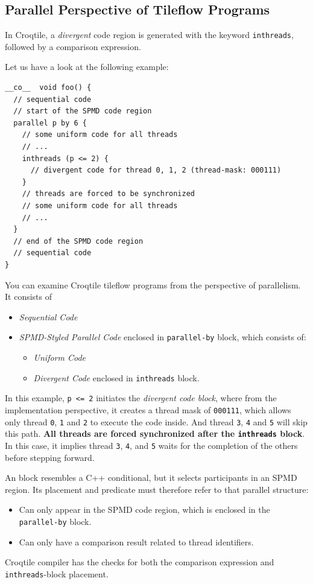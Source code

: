\subsection*{Parallel Perspective of Tileflow Programs}

In Croqtile, a \emph{divergent} code region is generated with the keyword \texttt{inthreads}, followed by a comparison expression.

Let us have a look at the following example:

\begin{lstlisting}[language=croqtile,caption={Parallel Perspective of Tileflow Programs}]
__co__  void foo() {
  // sequential code
  // start of the SPMD code region
  parallel p by 6 {
    // some uniform code for all threads
    // ...
    inthreads (p <= 2) {
      // divergent code for thread 0, 1, 2 (thread-mask: 000111)
    }
    // threads are forced to be synchronized
    // some uniform code for all threads
    // ...
  }
  // end of the SPMD code region
  // sequential code
}
\end{lstlisting}

You can examine Croqtile tileflow programs from the perspective of parallelism. It consists of

\begin{itemize}[leftmargin=1.6em]
\item \emph{Sequential Code}
\item \emph{SPMD-Styled Parallel Code} enclosed in \texttt{parallel-by} block, which consists of:
\begin{itemize}[leftmargin=1.6em]
\item \emph{Uniform Code}
\item \emph{Divergent Code} enclosed in \texttt{inthreads} block.
\end{itemize}
\end{itemize}

In this example, \texttt{p \textless{}= 2} initiates the \emph{divergent code block}, where from the implementation perspective, it creates a thread mask of \texttt{000111}, which allows only thread \texttt{0}, \texttt{1} and \texttt{2} to execute the code inside. And thread \texttt{3}, \texttt{4} and \texttt{5} will skip this path. \textbf{All threads are forced synchronized after the \texttt{inthreads} block}. In this case, it implies thread \texttt{3}, \texttt{4}, and \texttt{5} waits for the completion of the others before stepping forward.

An \co@inthreads@ block resembles a C++ conditional, but it selects participants in an SPMD region. Its placement and predicate must therefore refer to that parallel structure:

\begin{itemize}[leftmargin=1.6em]
\item Can only appear in the SPMD code region, which is enclosed in the \texttt{parallel-by} block.
\item Can only have a comparison result related to thread identifiers.
\end{itemize}

Croqtile compiler has the checks for both the comparison expression and \texttt{inthreads}-block placement.
